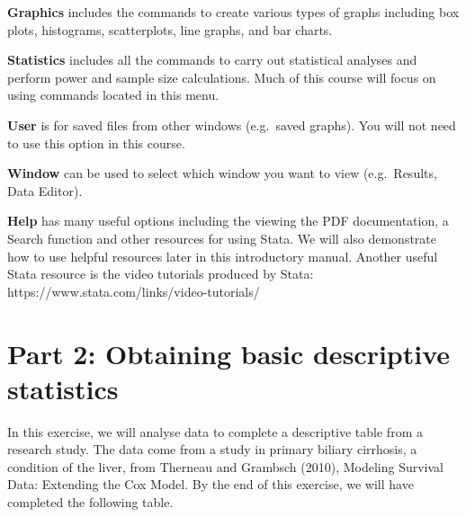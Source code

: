 \documentclass[
  a4paper,
]{memoir}
\begin{document}
\textbf{Graphics} includes the commands to create various types of
graphs including box plots, histograms, scatterplots, line graphs, and
bar charts.

\textbf{Statistics} includes all the commands to carry out statistical
analyses and perform power and sample size calculations. Much of this
course will focus on using commands located in this menu.

\textbf{User} is for saved files from other windows (e.g.~saved graphs).
You will not need to use this option in this course.

\textbf{Window} can be used to select which window you want to view
(e.g.~Results, Data Editor).

\textbf{Help} has many useful options including the viewing the PDF
documentation, a Search function and other resources for using Stata. We
will also demonstrate how to use helpful resources later in this
introductory manual. Another useful Stata resource is the video
tutorials produced by Stata:
https://www.stata.com/links/video-tutorials/

\hypertarget{part-2-obtaining-basic-descriptive-statistics}{%
\section{Part 2: Obtaining basic descriptive
statistics}\label{part-2-obtaining-basic-descriptive-statistics}}

In this exercise, we will analyse data to complete a descriptive table
from a research study. The data come from a study in primary biliary
cirrhosis, a condition of the liver, from Therneau and Grambsch (2010),
Modeling Survival Data: Extending the Cox Model. By the end of this
exercise, we will have completed the following table.

 
  \providecommand{\huxb}[2]{\arrayrulecolor[RGB]{#1}\global\arrayrulewidth=#2pt}
  \providecommand{\huxvb}[2]{\color[RGB]{#1}\vrule width #2pt}
  \providecommand{\huxtpad}[1]{\rule{0pt}{#1}}
  \providecommand{\huxbpad}[1]{\rule[-#1]{0pt}{#1}}
\end{document}
